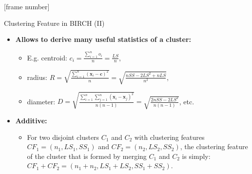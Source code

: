 \documentclass[aspectratio=169,t,xcolor=dvipsnames]{beamer}
\begin{document}
  { %
    [frame number]
    \begin{frame}{Clustering Feature in BIRCH (II)}
      \begin{itemize}
        \item \textbf{Allows to derive many useful statistics of a cluster:}
        \begin{itemize}
          \item E.g. centroid: $c_i = \frac{\sum_{i=1}^{n}o_i}{n} = \frac{LS}{n}$,
          \item radius: $R = \sqrt{\frac{\sum_{i=1}^{n}(\mathbf{x}_i-\mathbf{c})^2}{n}} = \sqrt{\frac{nSS-2LS^2+nLS}{n^2}}$,
          \item diameter: $D = \sqrt{\frac{\sum_{i=1}^{n}\sum_{j=1}^{n}(\mathbf{x}_i-\mathbf{x}_j)^2}{n(n-1)}} = \sqrt{\frac{2nSS-2LS^2}{n(n-1)}}$, etc.
        \end{itemize}
        \item \textbf{Additive:}
        \begin{itemize}
          \item For two disjoint clusters $C_1$ and $C_2$ with clustering features $CF_1 = (n_1, LS_1, SS_1)$ and $CF_2 = (n_2, LS_2, SS_2)$, the clustering feature of the cluster that is formed by merging $C_1$ and $C_2$ is simply: $CF_1 + CF_2 = (n_1 + n_2, LS_1 + LS_2, SS_1 + SS_2)$.
        \end{itemize}
      \end{itemize}
    \end{frame}
  }
\end{document}
